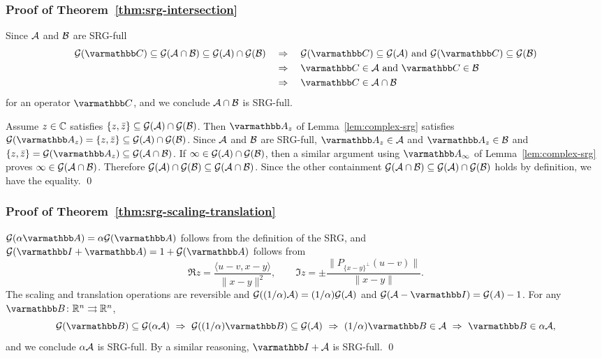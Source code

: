 \documentclass[10pt,mathserif]{beamer}
\begin{document}
\begin{frame}
\frametitle{Proof of Theorem~\ref{thm:srg-intersection}}
Since ${\mathcal{A}}$ and ${\mathcal{B}}$ are SRG-full
\begin{align*}
\cG(\opC)\subseteq\cG(\cA\cap\cB)\subseteq \cG(\cA)\cap \cG(\cB)
\quad&\Rightarrow\quad \cG(\opC)\subseteq \cG(\cA)\text{ and }\cG(\opC)\subseteq \cG(\cB)\\
\quad&\Rightarrow\quad \opC\in \cA\text{ and }\opC\in \cB\\
\quad&\Rightarrow\quad \opC\in \cA\cap \cB
\end{align*}
for an operator $\opC$, 
and we conclude ${\mathcal{A}}\cap{\mathcal{B}}$ is SRG-full.
\vspace{0.2in}


Assume $z\in\mathbb{C}$ satisfies $\{z,\bar{z}\}\subseteq {\mathcal{G}}({\mathcal{A}})\cap {\mathcal{G}}({\mathcal{B}})$.
Then $\opA_z$ of Lemma~\ref{lem:complex-srg} satisfies $\cG(\opA_z)=\{z,\bar{z}\}\subseteq \cG(\cA)\cap \cG(\cB)$.
Since ${\mathcal{A}}$ and ${\mathcal{B}}$ are SRG-full, $\opA_z\in \cA$ and $\opA_z\in \cB$
and $\{z,\bar{z}\}=\cG(\opA_z)\subseteq \cG(\cA\cap \cB)$.
If $\infty\in {\mathcal{G}}({\mathcal{A}})\cap {\mathcal{G}}({\mathcal{B}})$, then
a similar argument using $\opA_\infty$ of Lemma~\ref{lem:complex-srg} proves $\infty \in {\mathcal{G}}({\mathcal{A}}\cap {\mathcal{B}})$.
Therefore ${\mathcal{G}}({\mathcal{A}})\cap {\mathcal{G}}(\mathcal{B})\subseteq {\mathcal{G}}({\mathcal{A}}\cap \mathcal{B})$.
Since the other containment ${\mathcal{G}}({\mathcal{A}}\cap \mathcal{B})\subseteq {\mathcal{G}}({\mathcal{A}})\cap {\mathcal{G}}(\mathcal{B})$ holds by definition, we have the equality.
\qed
\end{frame}

\begin{frame}
\frametitle{Proof of Theorem~\ref{thm:srg-scaling-translation}}
 $\cG(\alpha \opA)=\alpha\cG(\opA)$ follows from the definition of the SRG, and 
 $\cG(\opI+ \opA)=1+\cG(\opA)$ follows from  
\[
\Re z
=\frac{\langle u-v,x-y\rangle}{\|x-y\|^2},
\qquad
\Im z
=\pm
\frac{\|P_{\{x-y\}^\perp}(u-v)\|}{\|x-y\|}.
\]
The scaling and translation operations are reversible and ${\mathcal{G}}((1/\alpha){\mathcal{A}})=(1/\alpha){\mathcal{G}}({\mathcal{A}})$ and $\cG(\cA-\opI)=\cG(A)-1$.
For any $\opB\colon\reals^n\rightrightarrows\reals^n$,
\[
\cG(\opB)\subseteq \cG(\alpha \cA)
\,\,\Rightarrow\,\,
\cG((1/\alpha)\opB)\subseteq \cG(\cA)
\,\,\Rightarrow\,\,
(1/\alpha)\opB\in \cA
\,\,\Rightarrow\,\,
\opB\in\alpha \cA,
\]
and we conclude $\alpha {\mathcal{A}}$ is SRG-full.
By a similar reasoning,  $\opI+ \cA$ is SRG-full.
\qed
\end{frame}
\end{document}
